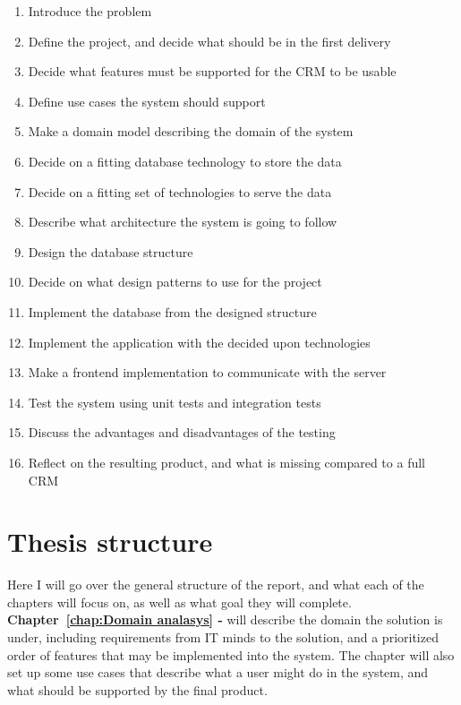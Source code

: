 \begin{enumerate}
  \item Introduce the problem
  \item Define the project, and decide what should be in the first delivery
  \item Decide what features must be supported for the CRM to be usable
  \item Define use cases the system should support
  \item Make a domain model describing the domain of the system
  \item Decide on a fitting database technology to store the data
  \item Decide on a fitting set of technologies to serve the data
  \item Describe what architecture the system is going to follow
  \item Design the database structure
  \item Decide on what design patterns to use for the project
  \item Implement the database from the designed structure
  \item Implement the application with the decided upon technologies
  \item Make a frontend implementation to communicate with the server
  \item Test the system using unit tests and integration tests
  \item Discuss the advantages and disadvantages of the testing
  \item Reflect on the resulting product, and what is missing compared to a full CRM
\end{enumerate}

\section{Thesis structure}
\label{sec:Thesis structure}
Here I will go over the general structure of the report, and what each of the
chapters will focus on, as well as what goal they will complete.\\ 

\textbf{Chapter~\ref{chap:Domain analasys} - }
will describe the domain the solution is under, including requirements from IT
minds to the solution, and a prioritized order of features that may be
implemented into the system. The chapter will also set up some use cases that
describe what a user might do in the system, and what should be supported by the
final product. 

